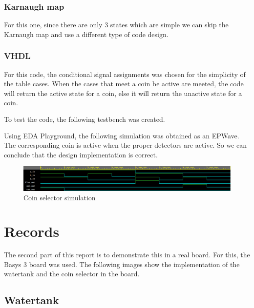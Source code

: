 \documentclass{article}
\begin{document}
\begin{multicols}{2}
	\subsubsection*{Karnaugh map}\label{Coin selector Karnaugh map}

	For this one, since there are only 3 states which are simple we can skip the Karnaugh map and use a different type of code design.

	\subsubsection*{VHDL}\label{Coin selector VHDL}
	For this code, the conditional signal assignments was chosen for the simplicity of the table cases. When the cases that meet a coin be active are meeted, the code will return the active state for a coin, else it will return the unactive state for a coin.

	

	To test the code, the following testbench was created.

	

	Using EDA Playground, the following simulation was obtained as an EPWave. The corresponding coin is active when the proper detectors are active. So we can conclude that the design implementation is correct.

	\begin{figure}[H]
		\centering
		\includegraphics[width=1\linewidth]{images/waves/coin-selector.png}
		\caption{Coin selector simulation}
		\label{Coin selector simulation}
	\end{figure}

	\section*{Records}\label{Records}
	The second part of this report is to demonstrate this in a real board. For this, the Basys 3 board was used. The following images show the implementation of the watertank and the coin selector in the board.

	\subsection*{Watertank}\label{Watertank Records}


\end{multicols}
\end{document}
